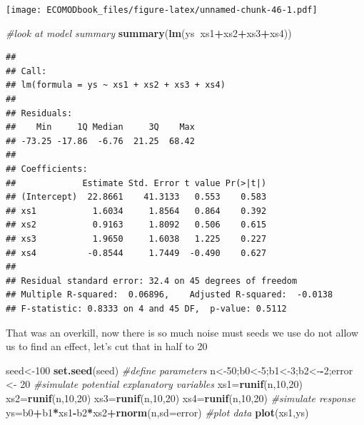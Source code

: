 \documentclass[
]{book}
\newenvironment{Shaded}{\begin{snugshade}}{\end{snugshade}}
\newcommand{\CommentTok}[1]{\textcolor[rgb]{0.56,0.35,0.01}{\textit{#1}}}
\newcommand{\DataTypeTok}[1]{\textcolor[rgb]{0.13,0.29,0.53}{#1}}
\newcommand{\DecValTok}[1]{\textcolor[rgb]{0.00,0.00,0.81}{#1}}
\newcommand{\KeywordTok}[1]{\textcolor[rgb]{0.13,0.29,0.53}{\textbf{#1}}}
\newcommand{\NormalTok}[1]{#1}
\newcommand{\OperatorTok}[1]{\textcolor[rgb]{0.81,0.36,0.00}{\textbf{#1}}}
\newcommand{\StringTok}[1]{\textcolor[rgb]{0.31,0.60,0.02}{#1}}
\begin{document}
\texttt{[image: ECOMODbook\_files/figure-latex/unnamed-chunk-46-1.pdf]}

\begin{Shaded}
\begin{Highlighting}[]
\CommentTok{#look at model summary}
\KeywordTok{summary}\NormalTok{(}\KeywordTok{lm}\NormalTok{(ys}\OperatorTok{~}\NormalTok{xs1}\OperatorTok{+}\NormalTok{xs2}\OperatorTok{+}\NormalTok{xs3}\OperatorTok{+}\NormalTok{xs4))}
\end{Highlighting}
\end{Shaded}

\begin{verbatim}
## 
## Call:
## lm(formula = ys ~ xs1 + xs2 + xs3 + xs4)
## 
## Residuals:
##    Min     1Q Median     3Q    Max 
## -73.25 -17.86  -6.76  21.25  68.42 
## 
## Coefficients:
##             Estimate Std. Error t value Pr(>|t|)
## (Intercept)  22.8661    41.3133   0.553    0.583
## xs1           1.6034     1.8564   0.864    0.392
## xs2           0.9163     1.8092   0.506    0.615
## xs3           1.9650     1.6038   1.225    0.227
## xs4          -0.8544     1.7449  -0.490    0.627
## 
## Residual standard error: 32.4 on 45 degrees of freedom
## Multiple R-squared:  0.06896,	Adjusted R-squared:  -0.0138 
## F-statistic: 0.8333 on 4 and 45 DF,  p-value: 0.5112
\end{verbatim}

That was an overkill, now there is so much noise must seeds we use do not allow us to find an effect, let's cut that in half to 20

\begin{Shaded}
\begin{Highlighting}[]
\NormalTok{seed<-}\DecValTok{100}
\KeywordTok{set.seed}\NormalTok{(seed)}
\CommentTok{#define parameters}
\NormalTok{n<-}\DecValTok{50}\NormalTok{;b0<-}\DecValTok{5}\NormalTok{;b1<-}\DecValTok{3}\NormalTok{;b2<-}\OperatorTok{-}\DecValTok{2}\NormalTok{;error <-}\StringTok{ }\DecValTok{20}
\CommentTok{#simulate potential explanatory variables}
\NormalTok{xs1=}\KeywordTok{runif}\NormalTok{(n,}\DecValTok{10}\NormalTok{,}\DecValTok{20}\NormalTok{)}
\NormalTok{xs2=}\KeywordTok{runif}\NormalTok{(n,}\DecValTok{10}\NormalTok{,}\DecValTok{20}\NormalTok{)}
\NormalTok{xs3=}\KeywordTok{runif}\NormalTok{(n,}\DecValTok{10}\NormalTok{,}\DecValTok{20}\NormalTok{)}
\NormalTok{xs4=}\KeywordTok{runif}\NormalTok{(n,}\DecValTok{10}\NormalTok{,}\DecValTok{20}\NormalTok{)}
\CommentTok{#simulate response}
\NormalTok{ys=b0}\OperatorTok{+}\NormalTok{b1}\OperatorTok{*}\NormalTok{xs1}\OperatorTok{-}\NormalTok{b2}\OperatorTok{*}\NormalTok{xs2}\OperatorTok{+}\KeywordTok{rnorm}\NormalTok{(n,}\DataTypeTok{sd=}\NormalTok{error)}
\CommentTok{#plot data}
\KeywordTok{plot}\NormalTok{(xs1,ys)}
\end{Highlighting}
\end{Shaded}
\end{document}
